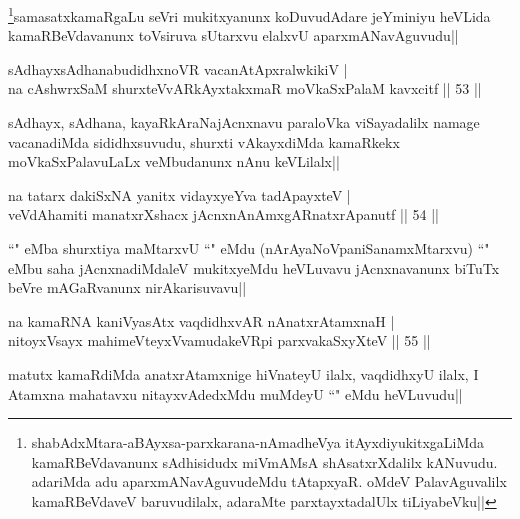 \begin{artha}
\footnote{shabAdxMtara-aBAyxsa-parxkarana-nAmadheVya itAyxdiyukitxgaLiMda kamaRBeVdavanunx sAdhisidudx miVmAMsA shAsatxrXdalilx kANuvudu. adariMda adu aparxmANavAguvudeMdu tAtapxyaR. oMdeV PalavAguvalilx kamaRBeVdaveV baruvudilalx, adaraMte parxtayxtadalUlx tiLiyabeVku||}samasatxkamaRgaLu seVri mukitxyanunx koDuvudAdare jeYminiyu heVLida kamaRBeVdavanunx toVsiruva sUtarxvu elalxvU aparxmANavAguvudu||
\end{artha}


\begin{shl}
sAdhayxsAdhanabudidhxnoVR vacanAtApxralwkikiV |\\
na cAshwrxSaM shurxteVvARkAyxtakxmaR moVkaSxPalaM kavxcitf \hfill || 53 ||
\end{shl}

\begin{artha}
sAdhayx, sAdhana, kayaRkAraNajAcnxnavu paraloVka viSayadalilx namage vacanadiMda sididhxsuvudu, shurxti vAkayxdiMda kamaRkekx moVkaSxPalavuLaLx veMbudanunx nAnu keVLilalx||
\end{artha}


\begin{shl}
na tatarx dakiSxNA yanitx vidayxyeYva tadApayxteV |\\
veVdAhamiti manatxrXshacx jAcnxnAnAmxgARnatxrApanutf \hfill || 54 ||
\end{shl}


\begin{artha}
``\stext" eMba shurxtiya maMtarxvU ``\stext" eMdu (nArAyaNoVpaniSanamxMtarxvu) ``\stext" eMbu saha jAcnxnadiMdaleV mukitxyeMdu heVLuvavu jAcnxnavanunx biTuTx beVre mAGaRvanunx nirAkarisuvavu||
\end{artha}


\begin{shl}
na kamaRNA kaniVyasAtx vaqdidhxvAR nAnatxrAtamxnaH |\\
nitoyxV\s sayx mahimeVteyxVvamudakeVR\s pi parxvakaSxyXteV \hfill || 55 ||
\end{shl}

\begin{artha}
matutx kamaRdiMda anatxrAtamxnige hiVnateyU ilalx, vaqdidhxyU ilalx, I Atamxna mahatavxu nitayxvAdedxMdu muMdeyU ``\stext" eMdu heVLuvudu||
\end{artha}

